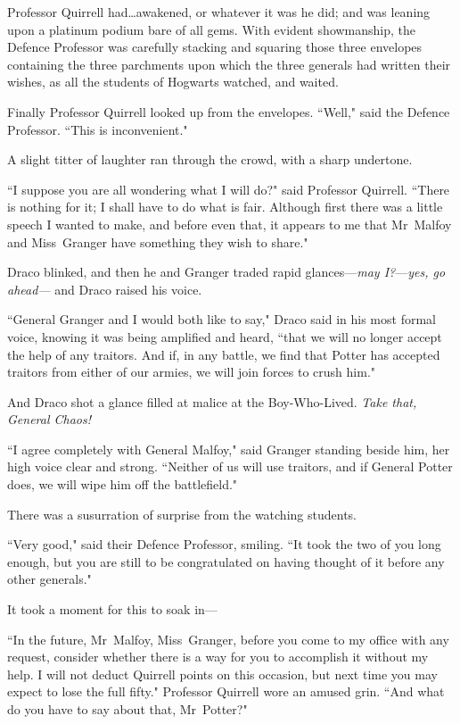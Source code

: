 Professor Quirrell had…awakened, or whatever it was he did; and was leaning upon a platinum podium bare of all gems. With evident showmanship, the Defence Professor was carefully stacking and squaring those three envelopes containing the three parchments upon which the three generals had written their wishes, as all the students of Hogwarts watched, and waited.

Finally Professor Quirrell looked up from the envelopes. ``Well," said the Defence Professor. ``This is inconvenient."

A slight titter of laughter ran through the crowd, with a sharp undertone.

``I suppose you are all wondering what I will do?" said Professor Quirrell. ``There is nothing for it; I shall have to do what is fair. Although first there was a little speech I wanted to make, and before even that, it appears to me that Mr~Malfoy and Miss~Granger have something they wish to share."

Draco blinked, and then he and Granger traded rapid glances—\emph{may I?}—\emph{yes, go ahead—} and Draco raised his voice.

``General Granger and I would both like to say," Draco said in his most formal voice, knowing it was being amplified and heard, ``that we will no longer accept the help of any traitors. And if, in any battle, we find that Potter has accepted traitors from either of our armies, we will join forces to crush him."

And Draco shot a glance filled at malice at the Boy-Who-Lived. \emph{Take that, General Chaos!}

``I agree completely with General Malfoy," said Granger standing beside him, her high voice clear and strong. ``Neither of us will use traitors, and if General Potter does, we will wipe him off the battlefield."

There was a susurration of surprise from the watching students.

``Very good," said their Defence Professor, smiling. ``It took the two of you long enough, but you are still to be congratulated on having thought of it before any other generals."

It took a moment for this to soak in—

``In the future, Mr~Malfoy, Miss~Granger, before you come to my office with any request, consider whether there is a way for you to accomplish it without my help. I will not deduct Quirrell points on this occasion, but next time you may expect to lose the full fifty." Professor Quirrell wore an amused grin. ``And what do you have to say about that, Mr~Potter?"

